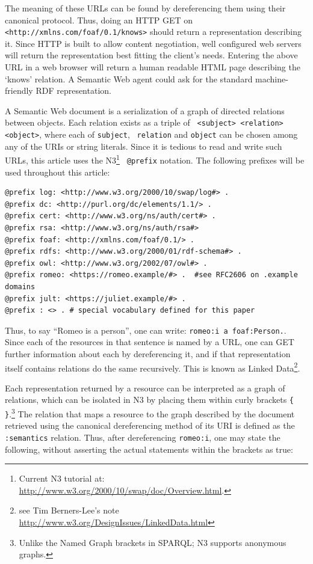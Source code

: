 \documentclass{llncs}
\begin{document}
The meaning of these URLs can be found by dereferencing them using
their canonical protocol. Thus, doing an HTTP GET on {\tt <http://xmlns.com/foaf/0.1/knows>} should return a
representation describing it. Since HTTP is built to allow content
negotiation, well configured web servers will return the representation best
fitting the client's needs. Entering the above URL in a web browser
will return a human readable HTML page describing the `knows'
relation. A Semantic Web agent could ask for the standard
machine-friendly RDF representation.

A Semantic Web document is a serialization of a graph of directed
relations between objects. Each relation exists as a triple of {\tt
  <subject> <relation> <object>}, where each of {\tt subject}, {\tt
  relation} and {\tt object} can be chosen among any of the URIs or string literals. Since it is tedious to read
and write such URLs, this article uses the N3\footnote{Current N3
  tutorial at:
  \url{http://www.w3.org/2000/10/swap/doc/Overview.html}.} {\tt
  @prefix} notation. The following prefixes will be used throughout
this article:

\begin{lstlisting}[basicstyle=\rm\scriptsize\ttfamily]
@prefix log: <http://www.w3.org/2000/10/swap/log#> .
@prefix dc: <http://purl.org/dc/elements/1.1/> .
@prefix cert: <http://www.w3.org/ns/auth/cert#> .
@prefix rsa: <http://www.w3.org/ns/auth/rsa#>
@prefix foaf: <http://xmlns.com/foaf/0.1/> .
@prefix rdfs: <http://www.w3.org/2000/01/rdf-schema#> .
@prefix owl: <http://www.w3.org/2002/07/owl#> .
@prefix romeo: <https://romeo.example/#> .  #see RFC2606 on .example domains
@prefix jult: <https://juliet.example/#> . 
@prefix : <> . # special vocabulary defined for this paper 
\end{lstlisting}

Thus, to say ``Romeo is a person'', one can write: {\tt romeo:i a foaf:Person.}. Since
each of the resources in that sentence is named by a URL, one can GET further information about each by dereferencing it, and if that representation itself contains relations do the same recursively. This is known as Linked Data\footnote{see Tim Berners-Lee's note  \url{
http://www.w3.org/DesignIssues/LinkedData.html}}.

Each representation returned by a resource can be interpreted as a
graph of relations, which can be isolated in N3 by placing them within
curly brackets {\tt \{ \}}.\footnote{Unlike the Named Graph
brackets in SPARQL; N3 supports anonymous graphs.}  The
relation that maps a resource to the graph described by the document retrieved using the
canonical dereferencing method of its URI  is defined as the {\tt :semantics} relation. Thus,
after dereferencing {\tt romeo:i}, one may state the following, without asserting the
actual statements within the brackets as true:
\end{document}
